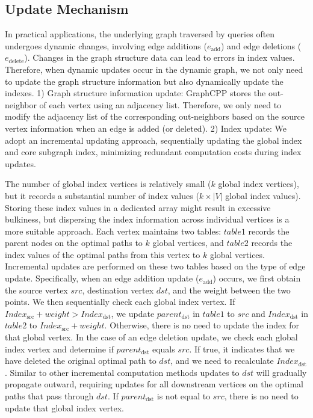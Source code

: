 \documentclass[lettersize,journal]{IEEEtran} %
\begin{document}
\subsection{Update Mechanism}
In practical applications, the underlying graph traversed by queries often undergoes dynamic changes, involving edge additions ($e_{\text{add}}$) and edge deletions ($e_{\text{delete}}$). Changes in the graph structure data can lead to errors in index values. Therefore, when dynamic updates occur in the dynamic graph, we not only need to update the graph structure information but also dynamically update the indexes. 1) Graph structure information update: GraphCPP stores the out-neighbor of each vertex using an adjacency list. Therefore, we only need to modify the adjacency list of the corresponding out-neighbors based on the source vertex information when an edge is added (or deleted). 2) Index update: We adopt an incremental updating approach, sequentially updating the global index and core subgraph index, minimizing redundant computation costs during index updates.

The number of global index vertices is relatively small ($k$ global index vertices), but it records a substantial number of index values ($k \times |V|$ global index values). Storing these index values in a dedicated array might result in excessive bulkiness, but dispersing the index information across individual vertices is a more suitable approach. Each vertex maintains two tables: $table1$ records the parent nodes on the optimal paths to $k$ global vertices, and $table2$ records the index values of the optimal paths from this vertex to $k$ global vertices. Incremental updates are performed on these two tables based on the type of edge update. Specifically, when an edge addition update ($e_{\text{add}}$) occurs, we first obtain the source vertex $src$, destination vertex $dst$, and the weight between the two points. We then sequentially check each global index vertex. If $Index_{\text{src}} + weight > Index_{\text{dst}}$, we update $parent_{\text{dst}}$ in $table1$ to $src$ and $Index_{\text{dst}}$ in $table2$ to $Index_{\text{src}} + weight$. Otherwise, there is no need to update the index for that global vertex. In the case of an edge deletion update, we check each global index vertex and determine if $parent_{\text{dst}}$ equals $src$. If true, it indicates that we have deleted the original optimal path to $dst$, and we need to recalculate $Index_{\text{dst}}$. Similar to other incremental computation methods\cite{kickstarter}\cite{graphbolt} updates to $dst$ will gradually propagate outward, requiring updates for all downstream vertices on the optimal paths that pass through $dst$. If $parent_{\text{dst}}$ is not equal to $src$, there is no need to update that global index vertex.
\end{document}
